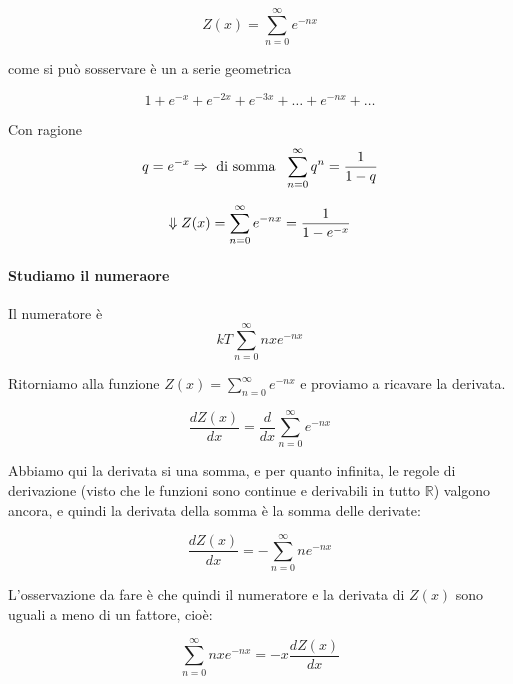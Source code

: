 \documentclass[11pt]{article}
\begin{document}
\begin{equation}\label{eq:Z}
Z(x) = \sum_{n=0}^\infty  e^{-nx}
\end{equation}

    come si può sosservare è un a serie geometrica

\begin{equation}\label{eq:ser geom}
1+e^{-x}+e^{-2x}+e^{-3x}+\dots +e^{-nx}+\dots
\end{equation}

    Con ragione \[
q=e^{-x} \Rightarrow \text{ di somma } \ \sum_{n=0}^\infty q^n = \frac{1}{1-q}\\
\]

    \[
\Downarrow\\
Z(x) = \sum_{n=0}^\infty  e^{-nx} =\frac{1}{1-e^{-x}}
\]

    \hypertarget{studiamo-il-numeraore}{%
\paragraph{Studiamo il numeraore}\label{studiamo-il-numeraore}}

Il numeratore è \begin{equation}\label{eq:num_p}
kT\sum_{n=0}^\infty n x e^{-nx}
\end{equation}

    Ritorniamo alla funzione \(Z(x)= \sum_{n=0}^\infty e^{-nx}\) e proviamo
a ricavare la derivata.

\begin{equation}\label{eq:der_Z}
\frac{dZ(x)}{dx}= \frac{d}{dx}\sum_{n=0}^\infty  e^{-nx}
\end{equation}

    Abbiamo qui la derivata si una somma, e per quanto infinita, le regole
di derivazione (visto che le funzioni sono continue e derivabili in
tutto \(\mathbb{R}\)) valgono ancora, e quindi la derivata della somma è
la somma delle derivate:

\begin{equation}\label{eq:der_Z1}
\frac{dZ(x)}{dx}=- \sum_{n=0}^\infty n e^{-nx}
\end{equation}

    L'osservazione da fare è che quindi il numeratore e la derivata di
\(Z(x)\) sono uguali a meno di un fattore, cioè:

\begin{equation}\label{eq:num_p1}
\sum_{n=0}^\infty nx e^{-nx} = - x \frac{dZ(x)}{dx}
\end{equation}
\end{document}
